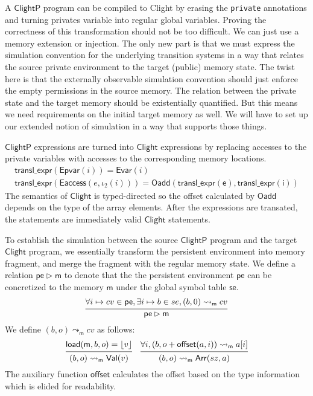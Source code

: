 \documentclass[acmsmall,screen,review,anonymous]{acmart}
\newcommand{\kw}[1]{\ensuremath{ \mathsf{#1} }}
\newcommand{\ClightP}{\ensuremath{ \mathsf{ClightP} }}
\newcommand{\Clight}{\ensuremath{ \mathsf{Clight} }}
\begin{document}
A \ClightP{} program can be compiled to Clight
by erasing the \texttt{private} annotations
and turning privates variable into regular
global variables.
{
\color{gray}
Proving the correctness of this transformation
should not be too difficult.
We can just use a memory extension or injection.
The only new part is that we must express
the simulation convention for the underlying transition systems
in a way that relates the source private environment
to the target (public) memory state.
The twist here is that
the externally observable simulation convention
should just enforce the empty permissions in the source memory.
The relation between the private state and the target memory
should be existentially quantified.
But this means we need requirements on the initial target memory as well.
We will have to set up our extended notion of simulation
in a way that supports those things.
}

$\ClightP$ expressions are turned into $\Clight$ expressions
by replacing accesses to the private variables
with accesses to the corresponding memory locations.
\begin{gather*}
  \kw{transl\_expr}(\kw{Epvar}(i)) = \kw{Evar}(i)\\
  \kw{transl\_expr}(\kw{Eaccess}(e, \iota_2(i))) = \kw{Oadd}(\kw{transl\_expr(e)}, \kw{transl\_expr(i)})
\end{gather*}
The semantics of $\Clight$ is typed-directed
so the offset calculated by $\kw{Oadd}$
depends on the type of the array elements.
After the expressions are transated, the statements
are immediately valid $\Clight$ statements.

To establish the simulation between
the source $\ClightP$ program and the target $\Clight$ program,
we essentially transform the persistent environment into memory fragment,
and merge the fragment with the regular memory state.
We define a relation $\kw{pe} \rhd \kw{m}$
to denote that the the persistent environment $\kw{pe}$
can be concretized to the memory $\kw{m}$ under the global symbol table $\kw{se}$.
\[
  \begin{prooftree}
    \hypo{\forall i \mapsto cv \in \kw{pe}, \exists i \mapsto b \in se,
      (b,0) \leadsto_{\kw{m}} cv}
    \infer1{\kw{pe} \rhd \kw{m}}
  \end{prooftree}
\]
We define $(b, o) \leadsto_{\kw{m}} cv$ as follows:
\begin{gather*}
  {
  \begin{prooftree}
    \hypo{\kw{load}(\kw{m}, b, o) = \lfloor v \rfloor }
    \infer1{(b, o) \leadsto_{\kw{m}} \kw{Val}(v)}
  \end{prooftree}
  }
  \quad
  {
  \begin{prooftree}
    \hypo{\forall i, (b, o+\kw{offset}(a, i)) \leadsto_{\kw{m}} a[i]}
    \infer1{(b, o) \leadsto_{\kw{m}} \kw{Arr}(sz, a)}
  \end{prooftree}
  }
\end{gather*}
The auxiliary function $\kw{offset}$
calculates the offset based on the type information
which is elided for readability.
\end{document}
